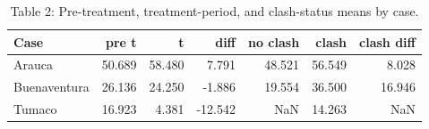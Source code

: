 \begin{table}

\caption{\label{tab:prepost_means}Table 2: Pre-treatment, treatment-period, and clash-status means by case.}
\centering
\begin{tabular}[t]{lrrrrrr}
\toprule
Case & pre t & t & diff & no clash & clash & clash diff\\
\midrule
Arauca & 50.689 & 58.480 & 7.791 & 48.521 & 56.549 & 8.028\\
Buenaventura & 26.136 & 24.250 & -1.886 & 19.554 & 36.500 & 16.946\\
Tumaco & 16.923 & 4.381 & -12.542 & NaN & 14.263 & NaN\\
\bottomrule
\end{tabular}
\end{table}
